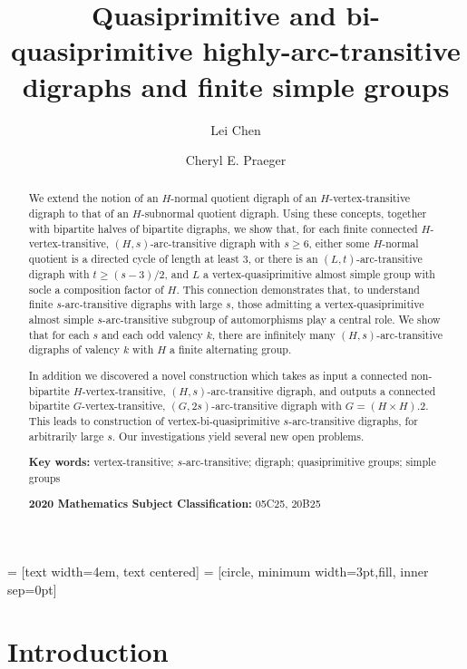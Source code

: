 \documentclass[11pt]{amsart}
\title[Highly-arc-transitive digraphs]{Quasiprimitive and bi-quasiprimitive highly-arc-transitive digraphs and finite simple groups}
\author{Lei Chen}
\author{Cheryl E. Praeger}
\date{}
\begin{document}
 = [text width=4em, text centered]
 = [circle, minimum width=3pt,fill, inner sep=0pt]

\begin{abstract}
    We extend the notion of an $H$-normal quotient digraph of an $H$-vertex-transitive digraph to that of an $H$-subnormal quotient digraph. Using these concepts, together with bipartite halves of bipartite digraphs, we show that, for each finite connected  $H$-vertex-transitive, $(H,s)$-arc-transitive digraph with $s\geqslant6$, either some $H$-normal quotient is a directed cycle of length at least $3$, or there is an $(L,t)$-arc-transitive digraph with $t\geqslant (s-3)/2$, and $L$ a vertex-quasiprimitive almost simple group with socle a composition factor of $H$.  This connection demonstrates that, to understand finite $s$-arc-transitive digraphs with large $s$, those admitting a vertex-quasiprimitive almost simple $s$-arc-transitive subgroup of automorphisms play a central role. We show that for each  $s$ and each odd valency $k$, there are infinitely many $(H,s)$-arc-transitive digraphs of valency $k$ with $H$ a finite  alternating group.
   
    In addition we discovered a novel construction which takes as input a connected non-bipartite $H$-vertex-transitive, $(H,s)$-arc-transitive digraph, and outputs a connected bipartite $G$-vertex-transitive, $(G,2s)$-arc-transitive digraph with $G=(H\times H).2$. This leads to construction of vertex-bi-quasiprimitive $s$-arc-transitive digraphs, for arbitrarily large $s$.   Our investigations yield several new open problems.

\medskip\noindent
    \textbf{Key words:} vertex-transitive; \(s\)-arc-transitive; digraph; quasiprimitive groups; simple groups

\medskip\noindent
    \textbf{2020 Mathematics Subject Classification:} 05C25, 20B25
    
    
\end{abstract}

\maketitle


\section{Introduction}\label{s:intro}
\end{document}
